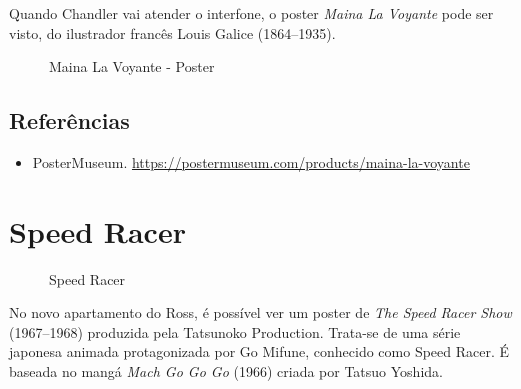 Quando Chandler vai atender o interfone, o poster \emph{Maina La
Voyante} pode ser visto, do ilustrador francês Louis Galice
(1864--1935).

\begin{figure}
  \centering
    \caption{Maina La Voyante - Poster\label{fig:maina-la-voyante-poster}}
\end{figure}

\hypertarget{referuxeancias-3}{%
\subsection{Referências}\label{referuxeancias-3}}

\begin{itemize}
\tightlist
\item
  \sloppy PosterMuseum. \url{https://postermuseum.com/products/maina-la-voyante}
\end{itemize}

\hypertarget{speed-racer}{%
\section{Speed Racer}\label{speed-racer}}

\begin{figure}
  \centering
    \caption{Speed Racer\label{fig:speed-racer}}
\end{figure}

No novo apartamento do Ross, é possível ver um poster de \emph{The Speed
Racer Show} (1967--1968) produzida pela Tatsunoko Production. Trata-se
de uma série japonesa animada protagonizada por Go Mifune, conhecido
como Speed Racer. É baseada no mangá \emph{Mach Go Go Go} (1966) criada
por Tatsuo Yoshida.

